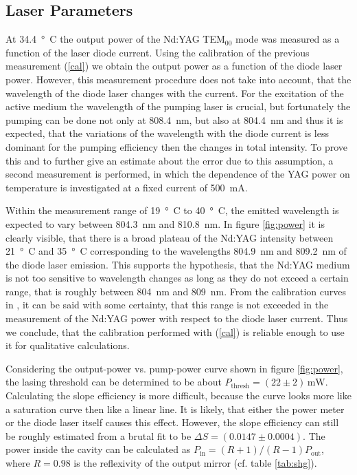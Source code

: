 \documentclass[a4paper]{scrartcl}
\numberwithin{equation}{section}
\numberwithin{figure}{section}
\numberwithin{table}{section}
\newcommand{\Formel}[1]{(\ref{#1})}
\begin{document}
\subsection{Laser Parameters}
At \SI{34.4}{\degree C} the output power of the Nd:YAG  TEM$_{00}$ mode was measured as a function of the laser diode current. Using the calibration of the previous measurement \Formel{cal} we obtain the output power as a function of the diode laser power. However, this measurement procedure does not take into account, that the wavelength of the diode laser changes with the current. For the excitation of the active medium the wavelength of the pumping laser is crucial, but fortunately the pumping can be done not only at \SI{808.4}{nm}, but also at \SI{804.4}{nm} and thus it is expected, that the variations of the wavelength with the diode current is less dominant for the pumping efficiency then the changes in total intensity. To prove this and to further give an estimate about the error due to this assumption, a second measurement is performed, in which the dependence of the YAG power on temperature is investigated at a fixed current of \SI{500}{mA}. 

Within the measurement range of \SI{19}{ \degree C} to \SI{40}{\degree  C}, the emitted wavelength is expected to vary between \SI{804.3}{nm} and \SI{810.8}{nm}. In figure \ref{fig:power} it is clearly visible, that there is a broad plateau of the Nd:YAG intensity between \SI{21}{\degree C} and \SI{35}{\degree C} corresponding to the wavelengths \SI{804.9}{nm} and \SI{809.2}{nm} of the diode laser emission. This supports the hypothesis, that the Nd:YAG medium is not too sensitive to wavelength changes as long as they do not exceed a certain range, that is roughly between \SI{804}{nm} and \SI{809}{nm}. From the calibration curves in \cite{script}, it can be said with some certainty, that this range is not exceeded in the measurement of the Nd:YAG power with respect to the diode laser current. Thus we conclude, that the calibration performed with \Formel{cal} is reliable enough to use it for qualitative calculations.

Considering the output-power vs. pump-power curve shown in figure \ref{fig:power}, the lasing threshold can be determined to be about $P_\text{thresh}=(22\pm 2)\,\text{mW}$. Calculating the slope efficiency is more difficult, because the curve looks more like a saturation curve then like a linear line. It is likely, that either the power meter or the diode laser itself causes this effect. However, the slope efficiency can still be roughly estimated from a brutal fit to be $\Delta S = (0.0147\pm 0.0004)$. The power inside the cavity can be calculated as $P_\text{in}=(R+1)/(R-1) P_\text{out}$, where $R=0.98$ is the reflexivity of the output mirror (cf. table \ref{tab:shg}).
\end{document}
